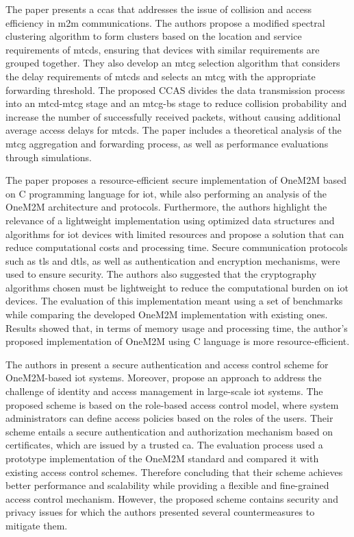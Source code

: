 \documentclass[a4paper,fleqn]{cas-dc}
\begin{document}
The paper \cite{Liang2018} presents a \gls{ccas} that addresses the issue of collision and access efficiency in \gls{m2m} communications. The authors propose a modified spectral clustering algorithm to form clusters based on the location and service requirements of \gls{mtcds}, ensuring that devices with similar requirements are grouped together. They also develop an \gls{mtcg} selection algorithm that considers the delay requirements of \gls{mtcds} and selects an \gls{mtcg} with the appropriate forwarding threshold. The proposed CCAS divides the data transmission process into an \gls{mtcd}-\gls{mtcg} stage and an \gls{mtcg}-\gls{bs} stage to reduce collision probability and increase the number of successfully received packets, without causing additional average access delays for \gls{mtcds}. The paper includes a theoretical analysis of the \gls{mtcg} aggregation and forwarding process, as well as performance evaluations through simulations.

The paper \cite{Thielemans2019} proposes a resource-efficient secure implementation of OneM2M based on C programming language for \gls{iot}, while also performing an analysis of the OneM2M architecture and protocols. Furthermore, the authors highlight the relevance of a lightweight implementation using optimized data structures and algorithms for \gls{iot} devices with limited resources and propose a solution that can reduce computational costs and processing time. Secure communication protocols such as \gls{tls} and \gls{dtls}, as well as authentication and encryption mechanisms, were used to ensure security. The authors also suggested that the cryptography algorithms chosen must be lightweight to reduce the computational burden on \gls{iot} devices. The evaluation of this implementation meant using a set of benchmarks while comparing the developed OneM2M implementation with existing ones. Results showed that, in terms of memory usage and processing time, the author's proposed implementation of OneM2M using C language is more resource-efficient.

The authors in \cite{Benoygopal2021} present a secure authentication and access control scheme for OneM2M-based \gls{iot} systems. Moreover, propose an approach to address the challenge of identity and access management in large-scale \gls{iot} systems. The proposed scheme is based on the role-based access control model, where system administrators can define access policies based on the roles of the users. Their scheme entails a secure authentication and authorization mechanism based on certificates, which are issued by a trusted \gls{ca}. The evaluation process used a prototype implementation of the OneM2M standard and compared it with existing access control schemes. Therefore concluding that their scheme achieves better performance and scalability while providing a flexible and fine-grained access control mechanism. However, the proposed scheme contains security and privacy issues for which the authors presented several countermeasures to mitigate them.
\end{document}
